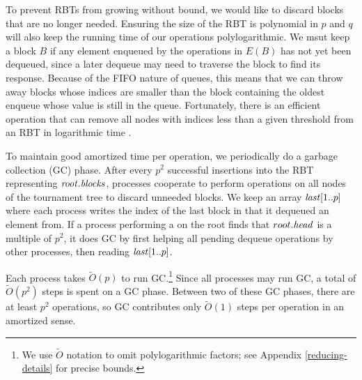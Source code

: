 To prevent RBTs from growing without bound, we would like to discard
blocks that are no longer needed.
Ensuring the size of the RBT is polynomial in $p$ and $q$ will 
also keep the running time of our operations polylogarithmic.
We msut keep a block $B$ if any element enqueued by the operations in $E(B)$ has
not yet been dequeued, since a later dequeue may need to traverse the block to 
find its response.
Because of the FIFO nature of queues, this means that we can throw away 
blocks whose indices are smaller than the block containing the oldest enqueue whose
value is still in the queue.
Fortunately, there is an efficient  operation that can remove
all nodes with indices less than a given threshold from an RBT in logarithmic time \cite[Sec.~4.2]{Tar83}.

To maintain good amortized time per operation, we periodically do a garbage collection (GC) phase.
After every $p^2$ successful insertions into the RBT representing $\mbox{\textnormal{\textit{root}}}.\mbox{\textit{blocks}}$,
processes cooperate to perform  operations on all nodes of the tournament tree  
to discard unneeded blocks.
We keep an array $\mbox{\textnormal{\textit{last}}}[1..p]$ where each process writes the index of the last block in
 that it dequeued an element from.
If a process performing a  on the root finds that $root.\mbox{\textit{head}}$ is a multiple
of $p^2$, it does GC by first helping all pending dequeue operations by other processes,
then reading $\mbox{\textnormal{\textit{last}}}[1..p]$.


Each process takes $\tilde{O}(p)$ to run GC.\footnote{We use $\tilde{O}$ notation
to omit polylogarithmic factors; see Appendix \ref{reducing-details} for precise bounds.}
Since all processes may run GC,
a total of $\tilde{O}(p^2)$ steps is spent on a GC phase.
Between two of these GC phases, there are at least $p^2$ operations, so
GC contributes only $\tilde{O}(1)$ steps per operation in an amortized sense.


